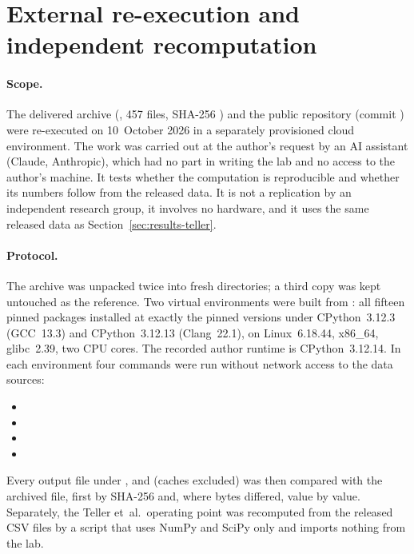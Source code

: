 \section{External re-execution and independent recomputation}
\label{sec:external}

\paragraph{Scope.}
The delivered archive (, 457 files, SHA-256 ) and the public repository (commit ) were re-executed on 10~October 2026 in a separately provisioned cloud environment. The work was carried out at the author's request by an AI assistant (Claude, Anthropic), which had no part in writing the lab and no access to the author's machine. It tests whether the computation is reproducible and whether its numbers follow from the released data. It is not a replication by an independent research group, it involves no hardware, and it uses the same released data as Section~\ref{sec:results-teller}. %

\paragraph{Protocol.}
The archive was unpacked twice into fresh directories; a third copy was kept untouched as the reference. Two virtual environments were built from : all fifteen pinned packages installed at exactly the pinned versions under CPython~3.12.3 (GCC~13.3) and CPython~3.12.13 (Clang~22.1), on Linux~6.18.44, x86\_64, glibc~2.39, two CPU cores. The recorded author runtime is CPython~3.12.14. In each environment four commands were run without network access to the data sources:
\begin{itemize}[leftmargin=*,itemsep=0pt,topsep=2pt]
\item {}
\item {}
\item {}
\item {}
\end{itemize}
Every output file under ,  and  (caches excluded) was then compared with the archived file, first by SHA-256 and, where bytes differed, value by value. Separately, the Teller et~al.\ operating point was recomputed from the released CSV files by a script that uses NumPy and SciPy only and imports nothing from the lab.


